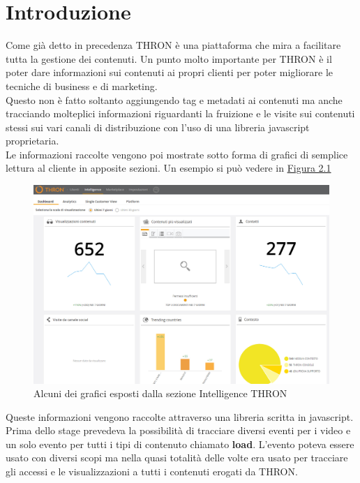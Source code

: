 \documentclass[a4paper, 12pt, twoside, openright]{book}
\begin{document}
\section{Introduzione}
Come già detto in precedenza THRON è una piattaforma che mira a facilitare tutta la gestione dei contenuti. Un punto molto importante per THRON è il poter dare informazioni sui contenuti ai propri clienti per poter migliorare le tecniche di business e di marketing.\\
Questo non è fatto soltanto aggiungendo tag e metadati ai contenuti ma anche tracciando molteplici informazioni riguardanti la fruizione e le visite sui contenuti stessi sui vari canali di distribuzione con l'uso di una libreria javascript proprietaria.\\
Le informazioni raccolte vengono poi mostrate sotto forma di grafici di semplice lettura al cliente in apposite sezioni. Un esempio si può vedere in \hyperref[reports-example]{Figura 2.1}
\begin{figure}[h] %
	\centering
	\label{reports-example}
	\includegraphics[width=1.0\textwidth]{images/reports-example.jpg}
	\caption{Alcuni dei grafici esposti dalla sezione Intelligence THRON}
\end{figure} 
Queste informazioni vengono raccolte attraverso una libreria scritta in javascript. Prima dello stage prevedeva la possibilità di tracciare diversi eventi per i video e un solo evento per tutti i tipi di contenuto chiamato \textbf{load}. L'evento poteva essere usato con diversi scopi ma nella quasi totalità delle volte era usato per tracciare gli accessi e le visualizzazioni a tutti i contenuti erogati da THRON.\\
\end{document}
